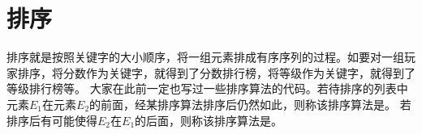 \chapter{排序}
排序就是按照关键字的大小顺序，将一组元素排成有序序列的过程。如要对一组玩家排序，将分数作为关键字，就得到了分数排行榜，将等级作为关键字，就得到了等级排行榜等。
大家在此前一定也写过一些排序算法的代码。若待排序的列表中元素$E_1$在元素$E_2$的前面，经某排序算法排序后仍然如此，则称该排序算法是。
若排序后有可能使得$E_2$在$E_1$的后面，则称该排序算法是。\\





